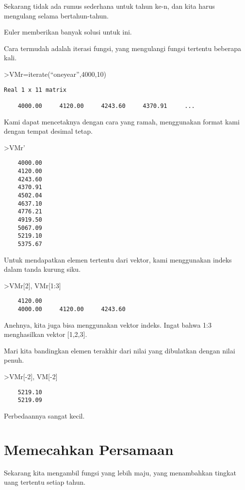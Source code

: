 \documentclass[
]{book}
\begin{document}
Sekarang tidak ada rumus sederhana untuk tahun ke-n, dan kita harus mengulang selama bertahun-tahun.

Euler memberikan banyak solusi untuk ini.

Cara termudah adalah iterasi fungsi, yang mengulangi fungsi tertentu beberapa kali.

\textgreater VMr=iterate(``oneyear'',4000,10)

\begin{verbatim}
Real 1 x 11 matrix

    4000.00     4120.00     4243.60     4370.91     ...
\end{verbatim}

Kami dapat mencetaknya dengan cara yang ramah, menggunakan format kami dengan tempat desimal tetap.

\textgreater VMr'

\begin{verbatim}
    4000.00 
    4120.00 
    4243.60 
    4370.91 
    4502.04 
    4637.10 
    4776.21 
    4919.50 
    5067.09 
    5219.10 
    5375.67 
\end{verbatim}

Untuk mendapatkan elemen tertentu dari vektor, kami menggunakan indeks dalam tanda kurung siku.

\textgreater VMr{[}2{]}, VMr{[}1:3{]}

\begin{verbatim}
    4120.00 
    4000.00     4120.00     4243.60 
\end{verbatim}

Anehnya, kita juga bisa menggunakan vektor indeks. Ingat bahwa 1:3 menghasilkan vektor {[}1,2,3{]}.

Mari kita bandingkan elemen terakhir dari nilai yang dibulatkan dengan nilai penuh.

\textgreater VMr{[}-2{]}, VM{[}-2{]}

\begin{verbatim}
    5219.10 
    5219.09 
\end{verbatim}

Perbedaannya sangat kecil.

\section{Memecahkan Persamaan}\label{memecahkan-persamaan}

Sekarang kita mengambil fungsi yang lebih maju, yang menambahkan tingkat uang tertentu setiap tahun.
\end{document}
